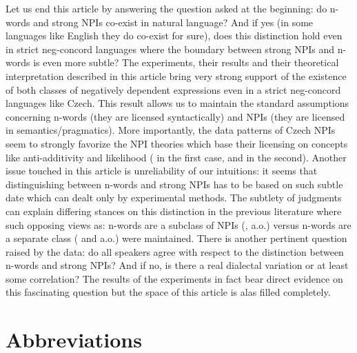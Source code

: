 \documentclass[output=paper,
]{langscibook}
\begin{document}
Let us end this article by answering the question asked at the beginning: do  n-words and strong NPIs co-exist in natural language? And if yes (in some languages like English they do co-exist for sure), does this distinction hold even in strict neg-concord languages where the boundary between strong NPIs and n-words is even more subtle? The experiments, their results and their theoretical interpretation described in this article bring very strong support of the existence of both classes of negatively dependent expressions even in a strict neg-concord languages like Czech. This result allows us to maintain the standard assumptions concerning n-words (they are licensed syntactically) and   NPIs (they are licensed in semantics/pragmatics). More importantly, the data patterns of Czech NPIs seem to strongly favorize the NPI theories which base their licensing on concepts like  anti-additivity and likelihood (\citealt{zwarts1998three} in the first case, \citealt{heim1984note} and \citealt{crnivc2014against} in the second). Another issue touched in this article is unreliability of our intuitions: it seems that distinguishing between n-words and strong NPIs has to be based on such subtle date which can dealt only by experimental methods. The subtlety of judgments can explain differing stances on this distinction in the previous literature where such opposing views as: n-words are a subclass of NPIs (\citealt{ladusaw1992expressing}, \citealt{fualuaus2016fragment} a.o.) versus n-words are a separate class (\citealt{zeijlstra2008negative} and \citealt{giannakidou2017landscape} a.o.) were maintained. There is another pertinent question raised by the data: do all speakers agree with respect to the distinction between n-words and strong NPIs? And if no, is there a real dialectal variation or at least some correlation? The results of the experiments in fact bear direct evidence on this fascinating question  but the space of this article is alas filled completely.

\section*{Abbreviations}
\end{document}
